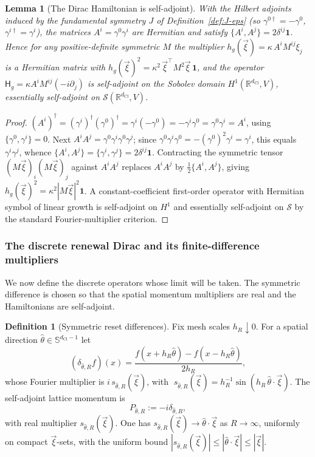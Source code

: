 \documentclass[11pt]{article}
\newtheorem{lemma}[theorem]{Lemma}
\theoremstyle{definition}
\newtheorem{definition}[theorem]{Definition}
\theoremstyle{remark}
\newcommand{\R}{\mathbb{R}}
\newcommand{\dCl}{d_{\mathrm{Cl}}}
\newcommand{\Sphere}{\mathbb{S}}
\newcommand{\one}{\mathbf{1}}
\newcommand{\Sch}{\mathcal{S}}
\newcommand{\Ham}{\mathsf{H}}
\begin{document}
\begin{lemma}[The Dirac Hamiltonian is self-adjoint]
\label{lem:alpha-selfadjoint}
With the Hilbert adjoints induced by the fundamental symmetry $J$ of
Definition~\ref{def:J-eps} (so $\gamma^{0\dagger}=-\gamma^0$, $\gamma^{i\dagger}=\gamma^i$),
the matrices $A^i=\gamma^0\gamma^i$ are Hermitian and satisfy
$\{A^i,A^j\}=2\delta^{ij}\one$.  Hence for any positive-definite symmetric
$M$ the multiplier $h_g(\vec\xi)=\kappa\,A^iM^{ij}\xi_j$ is a Hermitian matrix
with $h_g(\vec\xi)^2=\kappa^2\,\vec\xi^{\top}M^2\vec\xi\,\one$, and the operator
$\Ham_g=\kappa A^iM^{ij}(-i\partial_j)$ is self-adjoint on the Sobolev domain
$H^1(\R^{\dCl},V)$, essentially self-adjoint on $\Sch(\R^{\dCl},V)$.
\end{lemma}

\begin{proof}
$(A^i)^\dagger=(\gamma^i)^\dagger(\gamma^0)^\dagger=\gamma^i(-\gamma^0)
=-\gamma^i\gamma^0=\gamma^0\gamma^i=A^i$, using $\{\gamma^0,\gamma^i\}=0$.  Next
$A^iA^j=\gamma^0\gamma^i\gamma^0\gamma^j$; since $\gamma^0\gamma^i\gamma^0
=-(\gamma^0)^2\gamma^i=\gamma^i$, this equals $\gamma^i\gamma^j$, whence
$\{A^i,A^j\}=\{\gamma^i,\gamma^j\}=2\delta^{ij}\one$.  Contracting the symmetric
tensor $(M\vec\xi)_i(M\vec\xi)_j$ against $A^iA^j$ replaces $A^iA^j$ by
$\tfrac12\{A^i,A^j\}$, giving $h_g(\vec\xi)^2=\kappa^2|M\vec\xi|^2\one$.  A
constant-coefficient first-order operator with Hermitian symbol of linear growth
is self-adjoint on $H^1$ and essentially self-adjoint on $\Sch$ by the standard
Fourier-multiplier criterion.
\end{proof}

\subsubsection{The discrete renewal Dirac and its finite-difference multipliers}

We now define the discrete operators whose limit will be taken.  The symmetric
difference is chosen so that the spatial momentum multipliers are real and the
Hamiltonians are self-adjoint.

\begin{definition}[Symmetric reset differences]
\label{def:reset-differences}
Fix mesh scales $h_R\downarrow0$.  For a spatial direction
$\hat\theta\in\Sphere^{\dCl-1}$ let
\[
  (\delta_{\hat\theta,R}f)(x)=\frac{f(x+h_R\hat\theta)-f(x-h_R\hat\theta)}{2h_R},
\]
whose Fourier multiplier is $i\,s_{\hat\theta,R}(\vec\xi)$, with
$\;s_{\hat\theta,R}(\vec\xi)=h_R^{-1}\sin(h_R\,\hat\theta\cdot\vec\xi)$.  The
self-adjoint lattice momentum is
\[
  P_{\hat\theta,R}:=-i\delta_{\hat\theta,R},
\]
with real multiplier $s_{\hat\theta,R}(\vec\xi)$.  One has
$s_{\hat\theta,R}(\vec\xi)\to\hat\theta\cdot\vec\xi$ as $R\to\infty$, uniformly on
compact $\vec\xi$-sets, with the uniform bound
$|s_{\hat\theta,R}(\vec\xi)|\le|\hat\theta\cdot\vec\xi|\le|\vec\xi|$.
\end{definition}
\end{document}
